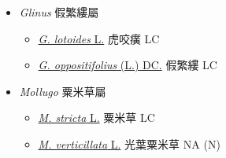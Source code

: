 
  \begin{itemize}
 \item[] \textit{Glinus} 假繁縷屬
                                
  \begin{itemize}
        \item[] \href{http://www.theplantlist.org/tpl1.1/search?q=Glinus+lotoides}{\textit{G. lotoides} L.}   虎咬癀   LC
        \item[] \href{http://www.theplantlist.org/tpl1.1/search?q=Glinus+oppositifolius}{\textit{G. oppositifolius} (L.) DC.}   假繁縷   LC
  \end{itemize}
 \item[] \textit{Mollugo} 粟米草屬
                                
  \begin{itemize}
        \item[] \href{http://www.theplantlist.org/tpl1.1/search?q=Mollugo+stricta}{\textit{M. stricta} L.}   粟米草   LC
        \item[] \href{http://www.theplantlist.org/tpl1.1/search?q=Mollugo+verticillata}{\textit{M. verticillata} L.}   光葉粟米草   NA (N)
  \end{itemize}
  \end{itemize}

